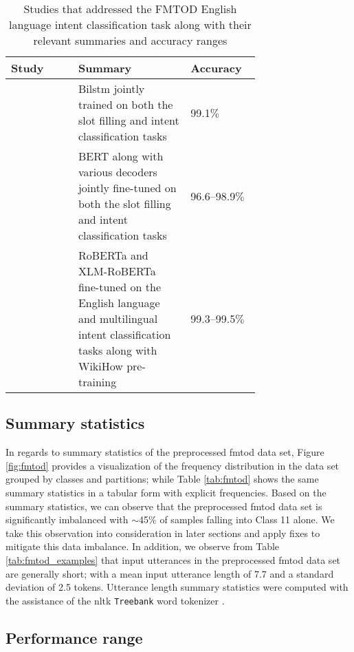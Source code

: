 \begin{table}[t!]
  \centering {}
  \begin{tabular}{L{0.27\linewidth} L{0.45\linewidth} l}
    \toprule
    Study & Summary & Accuracy \\
    \midrule
    \citet{schuster-etal-2019-cross-lingual} & Bi\ac{lstm} jointly trained on both the slot filling and intent classification tasks & 99.1$\%$ \\
    \citet{zhang2019joint} & BERT along with various decoders jointly fine-tuned on both the slot filling and intent classification tasks & 96.6--98.9$\%$ \\
    \citet{zhang-etal-2020-intent} & RoBERTa and XLM-RoBERTa fine-tuned on the English language and multilingual intent classification tasks along with WikiHow pre-training & 99.3--99.5$\%$ \\
    \bottomrule
  \end{tabular}
  \caption{Studies that addressed the FMTOD English language intent
    classification task along with their relevant summaries and accuracy
    ranges}
  \label{tab:fmtod_results}
\end{table}

\subsection{Summary statistics}

\label{section:fmtod_summary}

In regards to summary statistics of the preprocessed \ac{fmtod} data set, Figure
\ref{fig:fmtod} provides a visualization of the frequency distribution in the
data set grouped by classes and partitions; while Table \ref{tab:fmtod} shows
the same summary statistics in a tabular form with explicit frequencies. Based
on the summary statistics, we can observe that the preprocessed \ac{fmtod} data set
is significantly imbalanced with $\sim$45$\%$ of samples falling into Class 11
alone. We take this observation into consideration in later sections and apply
fixes to mitigate this data imbalance. In addition, we observe from Table
\ref{tab:fmtod_examples} that input utterances in the preprocessed \ac{fmtod} data
set are generally short; with a mean input utterance length of 7.7 and a
standard deviation of 2.5 tokens. Utterance length summary statistics were
computed with the assistance of the \ac{nltk} \texttt{Treebank} word tokenizer
\citep{bird-loper-2004-nltk}.

\subsection{Performance range}

